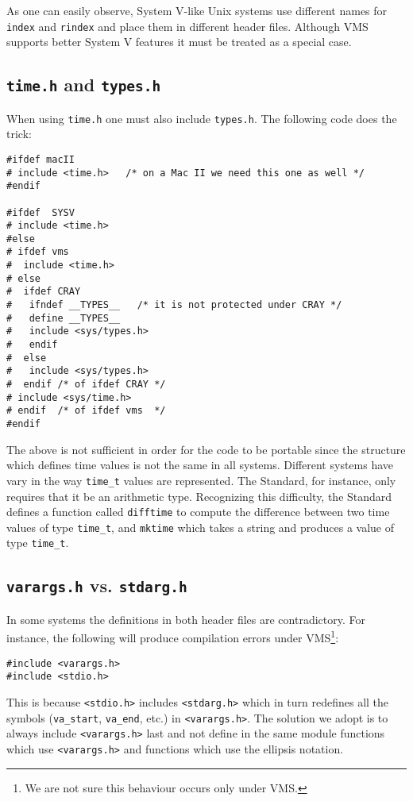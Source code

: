 As one can easily observe, System V-like Unix systems use different names
for {\tt index} and {\tt rindex} and place them in different header files.
Although VMS supports better System V features
it must be treated as a special case.

\subsection{{\tt time.h} and {\tt types.h}}

When using {\tt time.h} one must also include {\tt types.h}. The following
code does the trick:

\begin{verbatim}
#ifdef macII
# include <time.h>   /* on a Mac II we need this one as well */
#endif

#ifdef  SYSV
# include <time.h>
#else
# ifdef vms
#  include <time.h>
# else
#  ifdef CRAY
#   ifndef __TYPES__   /* it is not protected under CRAY */
#   define __TYPES__
#   include <sys/types.h>
#   endif
#  else
#   include <sys/types.h>
#  endif /* of ifdef CRAY */
# include <sys/time.h>
# endif  /* of ifdef vms  */
#endif
\end{verbatim}

The above is not sufficient in order for the code to be portable since
the structure which defines time values is not the same in all systems.
Different systems have vary in the way {\tt time\_t} values are represented.
The Standard, for instance, only requires that it be an arithmetic type.
Recognizing this difficulty, the Standard defines a function called
{\tt difftime} to compute the difference between two time values of
type {\tt time\_t}, and {\tt mktime} which takes a string and produces
a value of type {\tt time\_t}.

\subsection{{\tt varargs.h} vs. {\tt stdarg.h}}

In some systems the definitions in both header files
are contradictory. For instance, the following will produce compilation
errors under VMS\footnote{We are not sure this behaviour occurs only
under VMS.}:
\begin{verbatim}
#include <varargs.h>
#include <stdio.h>
\end{verbatim}

This is because {\tt <stdio.h>} includes {\tt <stdarg.h>} which in turn
redefines all the symbols ({\tt va\_start}, {\tt va\_end}, etc.)
in {\tt <varargs.h>}. The solution we adopt is to always include
{\tt <varargs.h>} last and not define in the same module functions
which use {\tt <varargs.h>} and functions which use the ellipsis notation.

